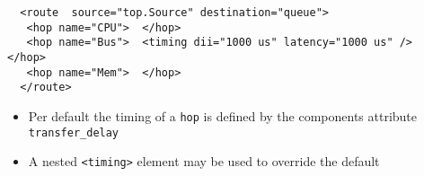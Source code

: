 \begin{frame}[fragile=singleslide]
\begin{lstlisting}
  <route  source="top.Source" destination="queue">
   <hop name="CPU">  </hop>
   <hop name="Bus">  <timing dii="1000 us" latency="1000 us" />  </hop>
   <hop name="Mem">  </hop>
  </route>
\end{lstlisting}
\begin{itemize}
\item Per default the timing of a \lstinline!hop! is defined by the components attribute \lstinline!transfer_delay!
\item A nested \lstinline!<timing>! element may be used to override the default
\end{itemize}
\end{frame}


